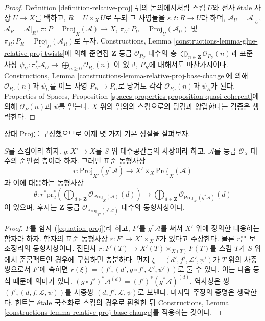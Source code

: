 \begin{proof}
Definition \ref{definition-relative-proj} 뒤의 논의에서처럼 스킴 $U$와
전사 \'etale 사상 $U \to X$를 택하고,
$R = U \times_X U$로 두되 그 사영들을 $s, t : R \to U$라 하며,
$\mathcal{A}_U = \mathcal{A}|_U$, $\mathcal{A}_R = \mathcal{A}|_R$,
$\pi : P = \underline{\text{Proj}}_X(\mathcal{A}) \to X$,
$\pi_U : P_U = \underline{\text{Proj}}_U(\mathcal{A}_U)$ 및
$\pi_R : P_R = \underline{\text{Proj}}_U(\mathcal{A}_R)$로 두자.
Constructions, Lemma
\ref{constructions-lemma-glue-relative-proj-twists}에 의해 준연접
$\mathbf{Z}$-등급 $\mathcal{O}_{P_U}$-대수의 층
$\bigoplus_{n \in \mathbf{Z}} \mathcal{O}_{P_U}(n)$과 표준 사상
$\psi_U : \pi_U^*\mathcal{A}_U \to \bigoplus_{n \geq 0} \mathcal{O}_{P_U}(n)$
이 있고, $P_R$에 대해서도 마찬가지이다. Constructions, Lemma
\ref{constructions-lemma-relative-proj-base-change}에 의해
$\mathcal{O}_{P_U}(n)$과 $\psi_U$를 어느 사영 $P_R \to P_U$로
당겨도 각각 $\mathcal{O}_{P_R}(n)$과 $\psi_R$가 된다.
Properties of Spaces, Proposition
\ref{spaces-properties-proposition-quasi-coherent}에 의해
$\mathcal{O}_{P}(n)$과 $\psi$를 얻는다. $X$ 위의 임의의 스킴으로의
당김과 양립한다는 검증은 생략한다.
\end{proof}

\noindent
상대 Proj를 구성했으므로 이제 몇 가지 기본 성질을 살펴보자.

\begin{lemma}
\label{lemma-relative-proj-base-change}
$S$를 스킴이라 하자. $g : X' \to X$를 $S$ 위 대수공간들의 사상이라
하고, $\mathcal{A}$를 등급 $\mathcal{O}_X$-대수의 준연접 층이라 하자.
그러면 표준 동형사상
$$
r :
\underline{\text{Proj}}_{X'}(g^*\mathcal{A})
\longrightarrow
X' \times_X \underline{\text{Proj}}_X(\mathcal{A})
$$
과 이에 대응하는 동형사상
$$
\theta :
r^*\text{pr}_2^*\left(\bigoplus\nolimits_{d \in \mathbf{Z}}
\mathcal{O}_{\underline{\text{Proj}}_X(\mathcal{A})}(d)\right)
\longrightarrow
\bigoplus\nolimits_{d \in \mathbf{Z}}
\mathcal{O}_{\underline{\text{Proj}}_{X'}(g^*\mathcal{A})}(d)
$$
이 있으며, 후자는 $\mathbf{Z}$-등급
$\mathcal{O}_{\underline{\text{Proj}}_{X'}(g^*\mathcal{A})}$-대수의
동형사상이다.
\end{lemma}

\begin{proof}
$F$를 함자 (\ref{equation-proj})라 하고, $F'$를
$g^*\mathcal{A}$를 써서 $X'$ 위에 정의한 대응하는 함자라 하자. 함자의 표준
동형사상 $r : F' \to X' \times_X F$가 있다고 주장한다. 물론 $r$은
보조정리의 동형사상이다. 전단사
$r : F'(T) \to X'(T) \times_{X(T)} F(T)$를 스킴 $T$가 $S$ 위에서
준콤팩트인 경우에 구성하면 충분하다.
먼저 $\xi = (d', f', \mathcal{L}', \psi')$가 $T$ 위의 사중쌍으로서
$F'$에 속하면
$r(\xi) = (f', (d', g \circ f', \mathcal{L}', \psi'))$로 둘 수 있다.
이는 다음 등식 때문에 의미가 있다.
$(g \circ f')^*\mathcal{A}^{(d)} = (f')^*(g^*\mathcal{A})^{(d)}$.
역사상은 쌍 $(f', (d, f, \mathcal{L}, \psi))$를 사중쌍
$(d, f', \mathcal{L}, \psi)$로 보낸다. 마지막 주장의 증명은 생략한다.
힌트는 \'etale 국소화로 스킴의 경우로 환원한 뒤 Constructions, Lemma
\ref{constructions-lemma-relative-proj-base-change}를 적용하는 것이다.
\end{proof}

